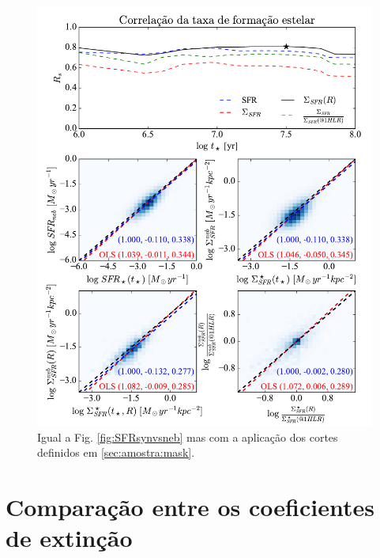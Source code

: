 \begin{figure}
	\centering
	\includegraphics[scale=0.7, clip]{figuras/Rs_allSFR_cuts.pdf}
	\caption[Comparação entre as SFR após cortes.]
	{Igual a Fig. \ref{fig:SFRsynvsneb} mas com a aplicação dos cortes definidos em
	\ref{sec:amostra:mask}.}
	\label{fig:SFRsynvsneb_cuts}
\end{figure}

\section{Comparação entre os coeficientes de extinção}
\label{sec:synvsneb:tauv}


